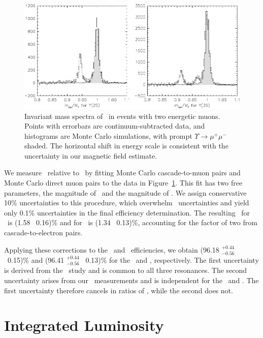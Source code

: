 \documentclass{cornell}
\begin{document}
\begin{figure}[p]
  \begin{center}
    \includegraphics[width=\linewidth]{plots/invariantmumass}
  \end{center}
  \caption[Determining ${\mathcal B}_\subs{cas}$ from \mumu\ invariant
  mass in \uss\ and \usss]{\label{invariantmumass} Invariant mass
  spectra of \mumu\ in events with two energetic muons.  Points with
  errorbars are continuum-subtracted data, and histograms are Monte
  Carlo simulations, with prompt $\Upsilon \to \mu^+\mu^-$ shaded.
  The horizontal shift in energy scale is consistent with the
  uncertainty in our magnetic field estimate.}
\end{figure}

We measure \bcas\ relative to \bmm\ by fitting Monte Carlo
cascade-to-muon pairs and Monte Carlo direct muon pairs to the data in
Figure~\ref{invariantmumass}.  This fit has two free parameters, the
magnitude of \bcas\ and the magnitude of \bmm.  We assign conservative
10\% uncertainties to this procedure, which overwhelm \bmm\
uncertainties and yield only 0.1\% uncertainties in the final
efficiency determination.  The resulting \bcas\ for \uss\ is (1.58
\PM\ 0.16)\% and for \usss\ is (1.34 \PM\ 0.13)\%, accounting for the
factor of two from cascade-to-electron pairs.

Applying these corrections to the \uss\ and \usss\ efficiencies, we
obtain (96.18 $^{+0.44}_{-0.56}$ \PM\ 0.15)\% and (96.41
$^{+0.44}_{-0.56}$ \PM\ 0.13)\% for the \uss\ and \usss, respectively.
The first uncertainty is derived from the \twotoone\ study and is
common to all three resonances.  The second uncertainty arises from
our \bcas\ measurements and is independent for the \uss\ and \usss.
The first uncertainty therefore cancels in ratios of \gee, while the
second does not.

\chapter{Integrated Luminosity}
\label{chp:luminosity}
\end{document}
